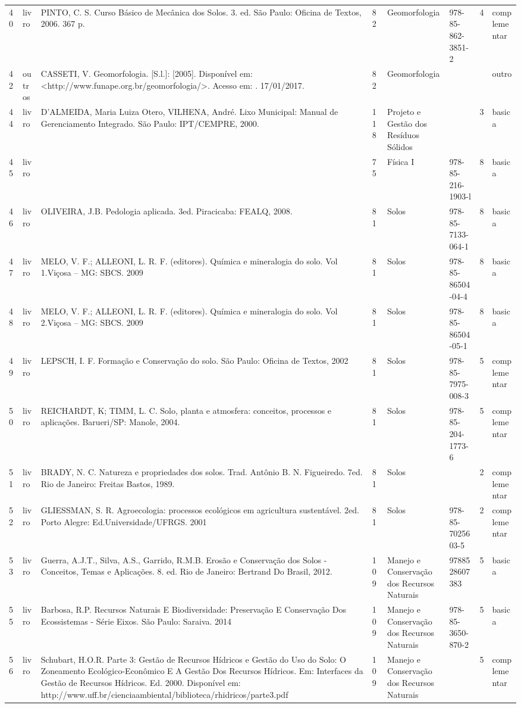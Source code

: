 \documentclass[12pt,a4paper,twoside]{report}
\begin{document}
\begin{longtable}{l|l|p{4cm}|l|p{3cm}|p{3cm}|l|l}
40&livro&PINTO, C. S. Curso Básico de Mecânica dos Solos. 3. ed. São Paulo: Oficina de Textos, 2006. 367 p.&82&Geomorfologia&978-85-862-3851-2&4&complementar\\
42&outros&CASSETI, V. Geomorfologia. [S.l.]: [2005]. Disponível em: <http://www.funape.org.br/geomorfologia/>. Acesso em: . 17/01/2017.&82&Geomorfologia&&&outro\\
44&livro&D’ALMEIDA, Maria Luiza Otero, VILHENA, André. Lixo Municipal: Manual de Gerenciamento Integrado. São Paulo: IPT/CEMPRE, 2000.&118&Projeto e Gestão dos Resíduos Sólidos&&3&basica\\
45&livro&&75&Física I&978-85-216-1903-l&8&basica\\
46&livro&OLIVEIRA, J.B. Pedologia aplicada.  3ed. Piracicaba: FEALQ, 2008.&81&Solos&978-85-7133-064-1&8&basica\\
47&livro&MELO, V. F.; ALLEONI, L. R. F. (editores). Química e mineralogia do solo. Vol 1.Viçosa – MG: SBCS. 2009&81&Solos&978-85-86504-04-4&8&basica\\
48&livro&MELO, V. F.; ALLEONI, L. R. F. (editores). Química e mineralogia do solo. Vol 2.Viçosa – MG: SBCS. 2009&81&Solos&978-85-86504-05-1&8&basica\\
49&livro&LEPSCH, I. F. Formação e Conservação do solo. São Paulo: Oficina de Textos, 2002&81&Solos&978-85-7975-008-3&5&complementar\\
50&livro&REICHARDT, K; TIMM, L. C. Solo, planta e atmosfera: conceitos, processos e aplicações. Barueri/SP: Manole, 2004.&81&Solos&978-85-204-1773-6&5&complementar\\
51&livro&BRADY, N. C. Natureza e propriedades dos solos. Trad. Antônio B. N. Figueiredo. 7ed. Rio de Janeiro: Freitas Bastos, 1989.&81&Solos&&2&complementar\\
52&livro&GLIESSMAN, S. R. Agroecologia: processos ecológicos em agricultura sustentável. 2ed. Porto Alegre: Ed.Universidade/UFRGS. 2001&81&Solos&978-85-7025603-5&2&complementar\\
53&livro&Guerra, A.J.T., Silva, A.S., Garrido, R.M.B. Erosão e Conservação dos Solos - Conceitos, Temas e Aplicações. 8. ed. Rio de Janeiro: Bertrand Do Brasil, 2012.&109&Manejo e Conservação dos Recursos Naturais&9788528607383&5&basica\\
55&livro&Barbosa, R.P. Recursos Naturais E Biodiversidade: Preservação E Conservação Dos Ecossistemas - Série Eixos. São Paulo: Saraiva. 2014&109&Manejo e Conservação dos Recursos Naturais&978-85-3650-870-2&5&basica\\
56&livro&Schubart, H.O.R. Parte 3: Gestão de Recursos Hídricos e Gestão do Uso do Solo: O Zoneamento Ecológico-Econômico E A Gestão Dos Recursos Hídricos. Em: Interfaces da Gestão de Recursos Hídricos. Ed. 2000. Disponível em: http://www.uff.br/cienciaambiental/biblioteca/rhidricos/parte3.pdf&109&Manejo e Conservação dos Recursos Naturais&&5&complementar\\

\end{longtable}
\end{document}
